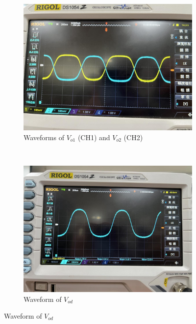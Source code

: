 \documentclass{article}
\begin{document}
\begin{CJK*}{UTF8}{bkai}
\begin{figure}[h]
    \begin{center}
    \begin{subfigure}[b]{0.40\textwidth}
        \includegraphics[width=\textwidth]{Vo1_and_Vo2.jpg}
        \caption*{Waveforms of $V_{o1}$ (CH1) and $V_{o2}$ (CH2)}
    \end{subfigure}
    ~
    \begin{subfigure}[b]{0.40\textwidth}
        \includegraphics[width=\textwidth]{Vod.jpg}
        \caption*{Waveform of $V_{od}$}
    \end{subfigure}
\end{center}
\end{figure}



\end{CJK*}
\end{document}
